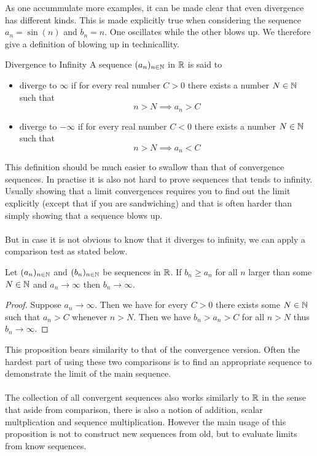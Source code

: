 \documentclass[a4paper]{article}
\begin{document}
As one accummulate more examples, it can be made clear that even divergence has different kinds. This is made explicitly true when considering the sequence $a_n=\sin(n)$ and $b_n=n$. One oscillates while the other blows up. We therefore give a definition of blowing up in technicallity. 

\begin{defn}{Divergence to Infinity}{} A sequence $(a_n)_{n\in\mathbb{N}}$ in $\mathbb{R}$ is said to 
\begin{itemize}
\item diverge to $\infty$ if for every real number $C>0$ there exists a number $N\in\mathbb{N}$ such that $$n>N\implies a_n>C$$
\item diverge to $-\infty$ if for every real number $C<0$ there exists a number $N\in\mathbb{N}$ such that $$n>N\implies a_n<C$$
\end{itemize}
\end{defn}

This definition should be much easier to swallow than that of convergence sequences. In practise it is also not hard to prove sequences that tends to infinity. Usually showing that a limit convergences requires you to find out the limit explicitly (except that if you are sandwiching) and that is often harder than simply showing that a sequence blows up. \\~\\
But in case it is not obvious to know that it diverges to infinity, we can apply a comparison test as stated below. 

\begin{prp}{}{} Let $(a_n)_{n\in\mathbb{N}}$ and $(b_n)_{n\in\mathbb{N}}$ be sequences in $\mathbb{R}$. If $b_n\geq a_n$ for all $n$ larger than some $N\in\mathbb{N}$ and $a_n\to\infty$ then $b_n\to\infty$. \tcbline
\begin{proof} Suppose $a_n\to\infty$. Then we have for every $C>0$ there exists some $N\in\mathbb{N}$ such that $a_n>C$ whenever $n>N$. Then we have $b_n>a_n>C$ for all $n>N$ thus $b_n\to\infty$. 
\end{proof}
\end{prp}

This proposition bears similarity to that of the convergence version. Often the hardest part of using these two comparisons is to find an appropriate sequence to demonstrate the limit of the main sequence. \\~\\

The collection of all convergent sequences also works similarly to $\mathbb{R}$ in the sense that aside from comparison, there is also a notion of addition, scalar multplication and sequence multiplication. However the main usage of this proposition is not to construct new sequences from old, but to evaluate limits from know sequences. 
\end{document}
